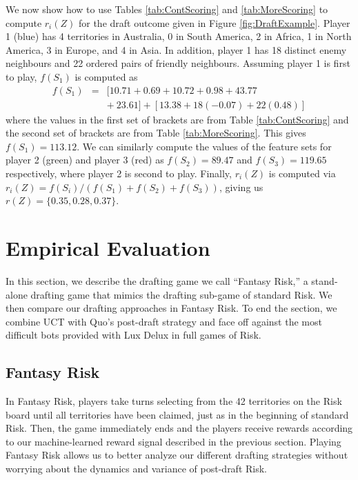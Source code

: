 \documentclass[letterpaper]{article}
\numberwithin{equation}{section}
\numberwithin{theorem}{section}
\numberwithin{lemma}{section}
\numberwithin{df}{section}
\begin{document}
We now show how to use Tables \ref{tab:ContScoring} and \ref{tab:MoreScoring} to compute $r_i(Z)$ for the draft outcome given in Figure \ref{fig:DraftExample}.  Player 1 (blue) has 4 territories in Australia, 0 in South America, 2 in Africa, 1 in North America, 3 in Europe, and 4 in Asia.  In addition, player 1 has 18 distinct enemy neighbours and 22 ordered pairs of friendly neighbours.  Assuming player 1 is first to play, $f(S_1)$ is computed as
\begin{eqnarray*}
 	f(S_1) &=& [10.71 + 0.69 + 10.72 + 0.98 + 43.77 \\ &&+\ 23.61] + [13.38 + 18(-0.07) + 22(0.48)] %
\end{eqnarray*}
where the values in the first set of brackets are from Table \ref{tab:ContScoring} and the second set of brackets are from Table \ref{tab:MoreScoring}.  This gives $f(S_1) = 113.12$.  We can similarly compute the values of the feature sets for player 2 (green) and player 3 (red) as %
$f(S_2) = 89.47$ and $f(S_3) = 119.65$ respectively, where player 2 is second to play.  Finally, $r_i(Z)$ is computed via $r_i(Z) = f(S_i) / \left(f(S_1) + f(S_2) + f(S_3) \right)$, giving us %
$r(Z) = \{0.35, 0.28, 0.37\}$.

\section{Empirical Evaluation}

In this section, we describe the drafting game we call ``Fantasy Risk,'' a stand-alone drafting game that mimics the drafting sub-game of standard Risk.  We then compare our drafting approaches in Fantasy Risk.  To end the section, we combine UCT with Quo's post-draft strategy and face off against the most difficult bots provided with Lux Delux in full games of Risk.

\subsection{Fantasy Risk}

In Fantasy Risk, players take turns selecting from the 42 territories on the Risk board until all territories have been claimed, just as in the beginning of standard Risk.  Then, the game immediately ends and the players receive rewards according to our machine-learned reward signal described in the previous section.  Playing Fantasy Risk allows us to better analyze our different drafting strategies without worrying about the dynamics and variance of post-draft Risk.  
\end{document}
